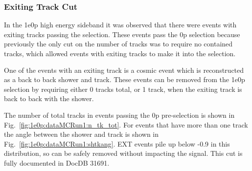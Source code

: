 \subsubsection{Exiting Track Cut}
\label{sec:sideband:newcuts:exitingtrack}
In the 1e0p high energy sideband it was observed that there were events with exiting tracks passing the selection. These events pass the 0p selection because previously the only cut on the number of tracks was to require no contained tracks, which allowed events with exiting tracks to make it into the selection. 

One of the events with an exiting track is a cosmic event which is reconstructed as a back to back shower and track. These events can be removed from the 1e0p selection by requiring either 0 tracks total, or 1 track, when the exiting track is back to back with the shower. 

The number of total tracks in events passing the 0p pre-selection is shown in Fig.~\ref{fig:1e0p:dataMCRun1:n_tk_tot}. For events that have more than one track the angle between the shower and track is shown in Fig.~\ref{fig:1e0p:dataMCRun1:shtkang}.  EXT events pile up below -0.9 in this distribution, so can be safely removed without impacting the signal.
This cut is fully documented in DocDB 31691.

